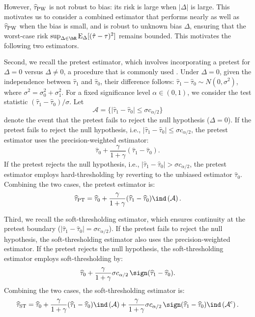 \documentclass[11pt]{article}
\def\E{{\mathrm E}}
\newcommand{\htau}{\widehat\tau}
\numberwithin{equation}{section}
\theoremstyle{definition}
\begin{document}
However, $\htau_{\rm PW}$ is not robust to bias: its risk is large when $\lvert \Delta \rvert$ is large. 
This motivates us to consider a combined estimator that performs nearly as well as $\htau_{\rm PW}$ when the bias is small, and is robust to unknown bias $\Delta$, ensuring that the worst-case risk $\sup_{\Delta \in \bR} \E_\Delta[(\hat\tau - \tau)^2]$ remains bounded. This motivates the following two estimators. 

Second, we recall the pretest estimator, which involves incorporating a pretest for $\Delta = 0$ versus $\Delta \neq 0$, a procedure that is commonly used \citep{bancroft1944biases,wallace1977pretest, bancroft1977inference,giles1993pre}. Under $\Delta = 0$, given the independence between $\htau_1$ and $\htau_0$, their difference follows: $\htau_1 - \htau_0 \sim N(0, \sigma^2)$, where $\sigma^2 = \sigma_0^2 + \sigma_1^2$. For a fixed significance level $\alpha \in (0,1)$, we consider the test statistic $(\htau_1 - \htau_0)/\sigma$. Let $$\mathcal{A} = \{\lvert \htau_1 - \htau_0 \rvert \le \sigma c_{\alpha/2}\}$$ denote the event that the pretest fails to reject the null hypothesis ($\Delta = 0$). If the pretest fails to reject the null hypothesis, i.e., $\lvert \htau_1 - \htau_0 \rvert \le \sigma c_{\alpha/2}$, the pretest estimator uses the precision-weighted estimator:
\[
  \htau_0 + \frac{\gamma}{1+\gamma} (\htau_1 - \htau_0).
\]
If the pretest rejects the null hypothesis, i.e., $\lvert \htau_1 - \htau_0 \rvert > \sigma c_{\alpha/2}$, the pretest estimator employs hard-thresholding by reverting to the unbiased estimator $\htau_0$. Combining the two cases, the pretest estimator is:
\[
\htau_{\rm PT} = \htau_0 + \frac{\gamma}{1+\gamma} (\htau_1 - \htau_0) \ind\left(\mathcal{A}\right).
\]

Third, we recall the soft-thresholding estimator, which ensures continuity at the pretest boundary ($\lvert \htau_1 - \htau_0 \rvert = \sigma c_{\alpha/2}$). If the pretest fails to reject the null hypothesis, the soft-thresholding estimator also uses the precision-weighted estimator. If the pretest rejects the null hypothesis, the soft-thresholding estimator employs soft-thresholding by:
\[
\htau_0 + \frac{\gamma}{1+\gamma} \sigma c_{\alpha/2}\,\sign(\htau_1 - \htau_0).
\]
Combining the two cases, the soft-thresholding estimator is:
\[
\htau_{\rm ST}= \htau_0 + \frac{\gamma}{1+\gamma} (\htau_1 - \htau_0)\ind\left(\mathcal{A}\right) 
+ \frac{\gamma}{1+\gamma} \sigma c_{\alpha/2}\,\sign(\htau_1 - \htau_0)\ind\left(\mathcal{A}^\textup{c}\right).
\]
\end{document}
